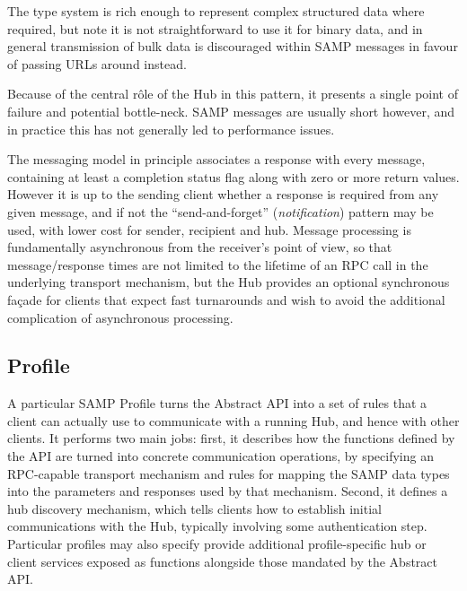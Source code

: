 \documentclass[5p]{elsarticle}
\begin{document}

The type system is rich enough to represent complex structured data
where required, but note it is not straightforward to use it for
binary data, and in general transmission of bulk data is
discouraged within SAMP messages in favour of passing URLs around instead.

Because of the central r\^{o}le of the Hub in this pattern,
it presents a single point of failure and potential bottle-neck.
SAMP messages are usually short however, and in practice this has
not generally led to performance issues.

The messaging model in principle associates
a response with every message, containing at least a completion
status flag along with zero or more return values.
However it is up to the sending client whether a response is
required from any given message, and if not the ``send-and-forget''
({\em notification\/}) pattern may be used,
with lower cost for sender, recipient and hub.
Message processing is fundamentally asynchronous from the
receiver's point of view, so that message/response times are
not limited to the lifetime of an RPC call in the underlying
transport mechanism, but the Hub provides an optional synchronous
fa\c{c}ade for clients that expect fast turnarounds and wish to
avoid the additional complication of asynchronous processing.

\subsection{Profile} \label{sec:profile}

A particular SAMP Profile turns the Abstract API into a set of rules
that a client can actually use to communicate with a running Hub,
and hence with other clients.
It performs two main jobs: first, it describes
how the functions defined by the API are turned into concrete
communication operations, by specifying an RPC-capable
transport mechanism and rules for mapping the SAMP
data types into the parameters and responses used by that mechanism.
Second, it defines a hub discovery mechanism,
which tells clients how to establish initial communications with the Hub,
typically involving some authentication step.
Particular profiles may also specify provide additional
profile-specific hub or client services exposed as functions
alongside those mandated by the Abstract API.
\end{document}
